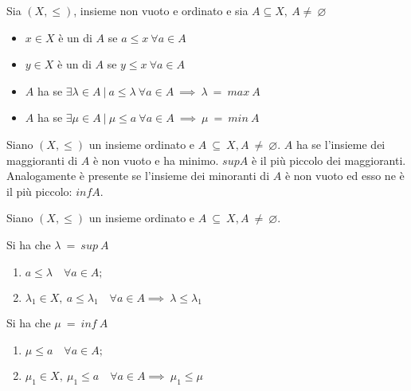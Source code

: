 \documentclass[../appunti.tex]{subfiles}
\begin{document}
\begin{defn} Sia $(X,\leq)$, insieme non vuoto e ordinato e sia $A \subseteq X,\ A \neq\ \varnothing$
\begin{itemize}
	\item $x \in X$ è un  di $A$ se $a \leq x\ \forall a\in A$
	\item $y \in X$ è un  di $A$ se $y \leq x\ \forall a\in A$
	\item $A$ ha  se $\exists \lambda \in A\ |\ a \leq \lambda\ \forall a \in A\ \implies\ \lambda\ =\ max\ A$
	\item $A$ ha  se $\exists \mu \in A\ |\ \mu \leq a\ \forall a \in A\ \implies\ \mu\ =\ min\ A$
\end{itemize}
\end{defn}

\begin{defn} Siano $(X,\leq)$ un insieme ordinato e $A\ \subseteq\ X, A\ \neq\ \varnothing$. $A$ ha  se l'insieme dei maggioranti di $A$ è non vuoto e ha minimo. $sup A$ è il più piccolo dei maggioranti.
Analogamente  è presente se l'insieme dei minoranti di $A$ è non vuoto ed esso ne è il più piccolo: $inf A$.
\end{defn}

\begin{defn} 

		Siano $(X,\leq)$ un insieme ordinato e $A\ \subseteq\ X, A\ \neq\ \varnothing $.

                 Si ha che $\lambda\ =\ sup\ A$ 
		\begin{enumerate}
			\item $a \leq \lambda \quad \forall a \in A;$
			\item $\lambda_1 \in X,\ a \leq \lambda_1 \quad \forall a \in A \implies\  \lambda \leq \lambda_1$
		\end{enumerate}

                
                 Si ha che $\mu\ =\ inf\ A$ 
		\begin{enumerate}
			\item $\mu \leq a \quad \forall a \in A;$
			\item $\mu_1 \in X,\ \mu_1 \leq a \quad \forall a \in A \implies\  \mu_1 \leq \mu $
		\end{enumerate}

\end{defn}
\end{document}
